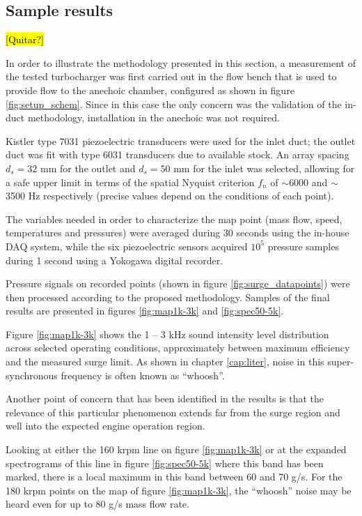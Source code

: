 \subsection{Sample results}
\label{sec:results_and_discussion}

\hl{[Quitar?]}

In order to illustrate the methodology presented in this section, a measurement of the tested turbocharger was first carried out in the flow bench that is used to provide flow to the anechoic chamber, configured as shown in figure \ref{fig:setup_schem}. Since in this case the only concern was the validation of the in-duct methodology, installation in the anechoic was not required. 

Kistler type 7031 piezoelectric transducers were used for the inlet duct; the outlet duct was fit with type 6031 transducers due to available stock. An array spacing $d_s=32$ mm for the outlet and $d_s=50$ mm for the inlet was selected, allowing for a safe upper limit in terms of the spatial Nyquist criterion $f_n$ of $\sim$6000 and $\sim$3500 Hz respectively (precise values depend on the conditions of each point).

The variables needed in order to characterize the map point (mass flow, speed, temperatures and pressures) were averaged during 30 seconds using the in-house DAQ system, while the six piezoelectric sensors acquired $10^5$ pressure samples during 1 second using a Yokogawa digital recorder.

Pressure signals on recorded points (shown in figure \ref{fig:surge_datapoints}) were then processed according to the proposed methodology. Samples of the final results are presented in figures \ref{fig:map1k-3k} and \ref{fig:spec50-5k}.

Figure \ref{fig:map1k-3k} shows the 1 -- 3 kHz sound intensity level distribution across selected operating conditions, approximately between maximum efficiency and the measured surge limit. As shown in chapter \ref{cap:liter}, noise in this super-synchronous frequency is often known as ``whoosh''.

Another point of concern that has been identified in the results is that the relevance of this particular phenomenon extends far from the surge region and well into the expected engine operation region.

Looking at either the 160 krpm line on figure \ref{fig:map1k-3k} or at the expanded spectrograms of this line in figure \ref{fig:spec50-5k} where this band has been marked, there is a local maximum in this band between 60 and 70 g/s. For the 180 krpm points on the map of figure \ref{fig:map1k-3k}, the ``whoosh'' noise may be heard even for up to 80 g/s mass flow rate.

